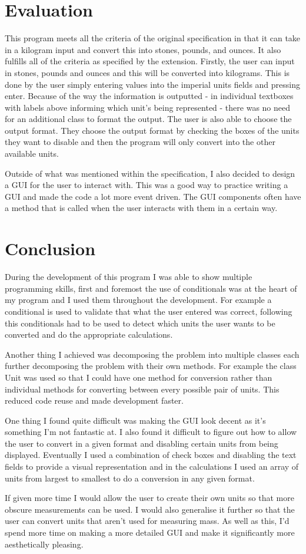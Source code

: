 \documentclass[a4paper]{article}
\begin{document}
\section*{Evaluation}
This program meets all the criteria of the original specification in that it can take in a kilogram input and convert this into stones, pounds, and 
ounces. It also fulfills all of the criteria as specified by the extension. Firstly, the user can input in stones, pounds and ounces and this will be 
converted into kilograms. This is done by the user simply entering values into the imperial units fields and pressing enter. Because of the way the 
information is outputted - in individual textboxes with labels above informing which unit's being represented - there was no need for an additional 
class to format the output. The user is also able to choose the output format. They choose the output format by checking the boxes of the units they 
want to disable and then the program will only convert into the other available units. 

Outside of what was mentioned within the specification, I also decided to design a GUI for the user to interact with. This was a good way to practice 
writing a GUI and made the code a lot more event driven. The GUI components often have a method that is called when the user interacts with them in a 
certain way.

\section*{Conclusion}
During the development of this program I was able to show multiple programming skills, first and foremost the use of conditionals was at the heart of 
my program and I used them throughout the development. For example a conditional is used to validate that what the user entered was correct, following 
this conditionals had to be used to detect which units the user wants to be converted and do the appropriate calculations.

Another thing I achieved was decomposing the problem into multiple classes each further decomposing the problem with their own methods. For example 
the class Unit was used so that I could have one method for conversion rather than individual methods for converting between every possible pair of 
units. This reduced code reuse and made development faster.

One thing I found quite difficult was making the GUI look decent as it's something I'm not fantastic at. I also found it difficult to figure out how 
to allow the user to convert in a given format and disabling certain units from being displayed. Eventually I used a combination of check boxes and 
disabling the text fields to provide a visual representation and in the calculations I used an array of units from largest to smallest to do a 
conversion in any given format.

If given more time I would allow the user to create their own units so that more obscure measurements can be used. I would also generalise it further 
so that the user can convert units that aren't used for measuring mass. As well as this, I'd spend more time on making a more detailed GUI and make it 
significantly more aesthetically pleasing.
\end{document}
